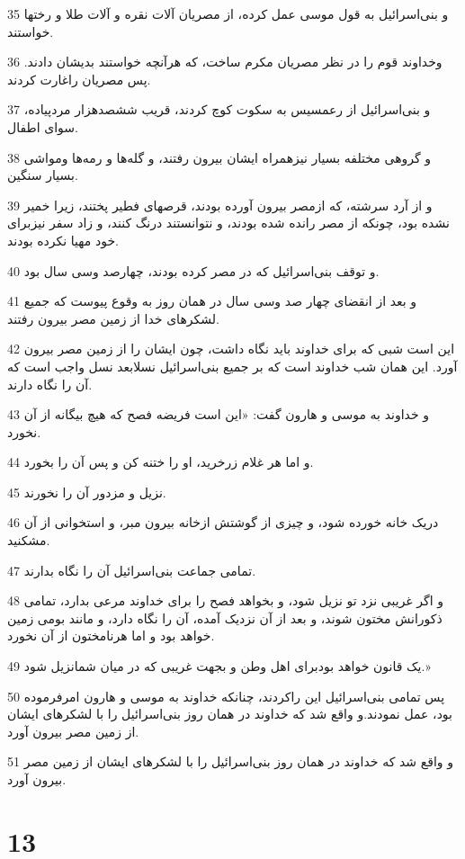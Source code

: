 \par 35 و بنی‌اسرائیل به قول موسی عمل کرده، از مصریان آلات نقره و آلات طلا و رختها خواستند.
\par 36 وخداوند قوم را در نظر مصریان مکرم ساخت، که هرآنچه خواستند بدیشان دادند. پس مصریان راغارت کردند.
\par 37 و بنی‌اسرائیل از رعمسیس به سکوت کوچ کردند، قریب ششصدهزار مردپیاده، سوای اطفال.
\par 38 و گروهی مختلفه بسیار نیزهمراه ایشان بیرون رفتند، و گله‌ها و رمه‌ها ومواشی بسیار سنگین.
\par 39 و از آرد سرشته، که ازمصر بیرون آورده بودند، قرصهای فطیر پختند، زیرا خمیر نشده بود، چونکه از مصر رانده شده بودند، و نتوانستند درنگ کنند، و زاد سفر نیزبرای خود مهیا نکرده بودند.
\par 40 و توقف بنی‌اسرائیل که در مصر کرده بودند، چهارصد وسی سال بود.
\par 41 و بعد از انقضای چهار صد وسی سال در همان روز به وقوع پیوست که جمیع لشکرهای خدا از زمین مصر بیرون رفتند.
\par 42 این است شبی که برای خداوند باید نگاه داشت، چون ایشان را از زمین مصر بیرون آورد. این همان شب خداوند است که بر جمیع بنی‌اسرائیل نسلابعد نسل واجب است که آن را نگاه دارند.
\par 43 و خداوند به موسی و هارون گفت: «این است فریضه فصح که هیچ بیگانه از آن نخورد.
\par 44 و اما هر غلام زرخرید، او را ختنه کن و پس آن را بخورد.
\par 45 نزیل و مزدور آن را نخورند.
\par 46 دریک خانه خورده شود، و چیزی از گوشتش ازخانه بیرون مبر، و استخوانی از آن مشکنید.
\par 47 تمامی جماعت بنی‌اسرائیل آن را نگاه بدارند.
\par 48 و اگر غریبی نزد تو نزیل شود، و بخواهد فصح را برای خداوند مرعی بدارد، تمامی ذکورانش مختون شوند، و بعد از آن نزدیک آمده، آن را نگاه دارد، و مانند بومی زمین خواهد بود و اما هرنامختون از آن نخورد.
\par 49 یک قانون خواهد بودبرای اهل وطن و بجهت غریبی که در میان شمانزیل شود.»
\par 50 پس تمامی بنی‌اسرائیل این راکردند، چنانکه خداوند به موسی و هارون امرفرموده بود، عمل نمودند.و واقع شد که خداوند در همان روز بنی‌اسرائیل را با لشکرهای ایشان از زمین مصر بیرون آورد.
\par 51 و واقع شد که خداوند در همان روز بنی‌اسرائیل را با لشکرهای ایشان از زمین مصر بیرون آورد. 
 
\chapter{13}

